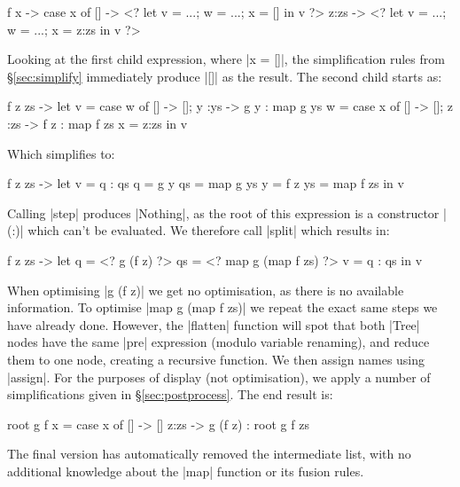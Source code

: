 \documentclass[draft]{sigplanconf}
\begin{document}
\begin{code}
\g f x -> case  x of
                []    -> <? let v = ...; w = ...; x = []    in v ?>
                z:zs  -> <? let v = ...; w = ...; x = z:zs  in v ?>
\end{code}

Looking at the first child expression, where |x = []|, the simplification rules from \S\ref{sec:simplify} immediately produce |[]| as the result. The second child starts as:

\begin{code}
\g f z zs ->
    let  v  = case  w  of [] -> []; y  :ys  -> g  y  : map g  ys
         w  = case  x  of [] -> []; z  :zs  -> f  z  : map f  zs
         x  = z:zs
    in   v
\end{code}

\noindent Which simplifies to:

\begin{code}
\g f z zs ->  let  v   = q : qs
                   q   = g y
                   qs  = map g ys
                   y   = f z
                   ys  = map f zs
              in   v
\end{code}

Calling |step| produces |Nothing|, as the root of this expression is a constructor |(:)| which can't be evaluated. We therefore call |split| which results in:

\begin{code}
\g f z zs ->  let  q   = <? g (f z) ?>
                   qs  = <? map g (map f zs) ?>
                   v   = q : qs
              in   v
\end{code}

When optimising |g (f z)| we get no optimisation, as there is no available information. To optimise |map g (map f zs)| we repeat the exact same steps we have already done. However, the |flatten| function will spot that both |Tree| nodes have the same |pre| expression (modulo variable renaming), and reduce them to one node, creating a recursive function. We then assign names using |assign|. For the purposes of display (not optimisation), we apply a number of simplifications given in \S\ref{sec:postprocess}. The end result is:

\begin{code}
root g f x = case  x of
                   []    -> []
                   z:zs  -> g (f z) : root g f zs
\end{code}

The final version has automatically removed the intermediate list, with no additional knowledge about the |map| function or its fusion rules.
\end{document}
